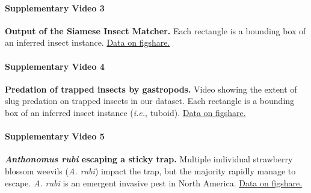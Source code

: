 \documentclass[12pt]{article}
\begin{document}
	\paragraph*{Supplementary Video 3}
	\textbf{Output of the Siamese Insect Matcher.} Each rectangle is a bounding box of an inferred insect instance.
	\href{https://figshare.com/s/096d4a80b93f8380c156}{Data on figshare.}
	
	
	\paragraph*{Supplementary Video 4}
	\textbf{Predation of trapped insects by gastropods.} Video showing the extent of slug predation on trapped insects in our dataset. Each rectangle is a bounding box of an inferred insect instance (\emph{i.e.}, tuboid).
	\href{https://figshare.com/s/889c8af79a7f90db263e}{Data on figshare.}
	
	\paragraph*{Supplementary Video 5}
	\textbf{\emph{Anthonomus rubi} escaping a sticky trap.} Multiple individual strawberry blossom weevils (\emph{A. rubi}) impact the trap, but the majority rapidly manage to escape. \emph{A. rubi} is an emergent invasive pest in North America.
	\href{https://figshare.com/s/0872dcd897ef7b82d1a3}{Data on figshare.}
	
\end{document}
